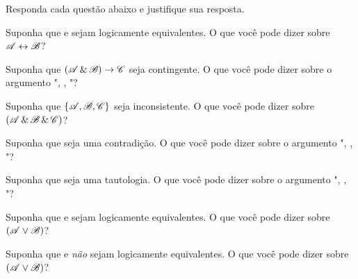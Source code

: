 \solutions
\problempart
\label{pr.TT.concepts}
Responda cada questão abaixo e justifique sua resposta.
\begin{earg}
\item Suponha que  e  sejam logicamente equivalentes. O que você pode dizer sobre $\mathscr{A}\leftrightarrow\mathscr{B}$?
\item Suponha que $(\mathscr{A}\,\&\,\mathscr{B})\rightarrow\mathscr{C}$ seja contingente. O que você pode dizer sobre o argumento ", , \therefore{}"?
\item Suponha que $\{\mathscr{A},\mathscr{B}, \mathscr{C}\}$ seja inconsistente. O que você pode dizer sobre $(\mathscr{A}\,\&\,\mathscr{B}\,\&\,\mathscr{C})$?
\item Suponha que  seja uma contradição. O que você pode dizer sobre o argumento ", , \therefore{}"?
\item Suponha que  seja uma tautologia. O que você pode dizer sobre o argumento ", , \therefore{}"?
\item Suponha que  e  sejam logicamente equivalentes. O que você pode dizer sobre $(\mathscr{A}\vee\mathscr{B})$?
\item Suponha que  e  \emph{não} sejam logicamente equivalentes. O que você pode dizer sobre $(\mathscr{A}\vee\mathscr{B})$?
\end{earg}

